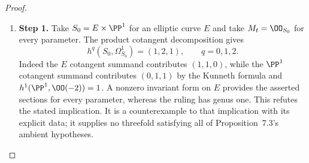 \begin{proof}
\begin{enumerate}[label={$\langle1\rangle$\arabic*.},leftmargin=*]
\item 
\noindent\textbf{Step 1.} Take $S_0=E\times\PP^1$ for an elliptic curve $E$ and take $M_t=\OO_{S_0}$ for every parameter. The product cotangent decomposition gives
\[
 h^q(S_0,\Omega^1_{S_0})=(1,2,1),\qquad q=0,1,2.
\]
Indeed the $E$ cotangent summand contributes $(1,1,0)$, while the $\PP^1$ cotangent summand contributes $(0,1,1)$ by the Kunneth formula and $h^1(\PP^1,\OO(-2))=1$. A nonzero invariant form on $E$ provides the asserted sections for every parameter, whereas the ruling has genus one. This refutes the stated implication. It is a counterexample to that implication with its explicit data; it supplies no threefold satisfying all of Proposition~7.3's ambient hypotheses.

\end{enumerate}
\end{proof}
